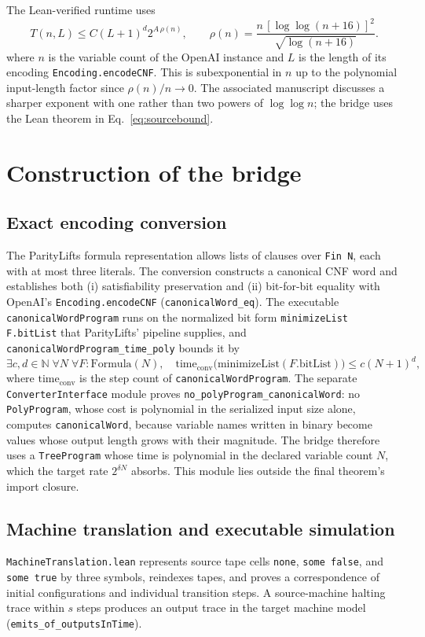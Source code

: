 \documentclass[11pt,letterpaper]{article}
\newcommand{\lean}[1]{\texttt{#1}}
\begin{document}
The Lean-verified runtime uses
\begin{equation}
T(n,L)\leq C(L+1)^d 2^{A\,\rho(n)},\qquad
\rho(n)=\frac{n\,[\log\log(n+16)]^2}{\sqrt{\log(n+16)}}.
\label{eq:sourcebound}
\end{equation}
where $n$ is the variable count of the OpenAI instance and $L$ is the length of its encoding \lean{Encoding.encodeCNF}.
This is subexponential in $n$ up to the polynomial input-length factor since $\rho(n)/n\to0$. The associated manuscript discusses a sharper exponent with one rather than two powers of $\log\log n$; the bridge uses the Lean theorem in Eq.~\eqref{eq:sourcebound}.

\section{Construction of the bridge}
\subsection{Exact encoding conversion}
The ParityLifts formula representation allows lists of clauses over \lean{Fin N}, each with at most three literals. The conversion constructs a canonical CNF word and establishes both (i) satisfiability preservation and (ii) bit-for-bit equality with OpenAI's \lean{Encoding.encodeCNF} (\lean{canonicalWord\_eq}). The executable \lean{canonicalWordProgram} runs on the normalized bit form \lean{minimizeList F.bitList} that ParityLifts' pipeline supplies, and \lean{canonicalWordProgram\_time\_poly} bounds it by
\begin{equation}
\exists c,d\in\mathbb N\;\forall N\;\forall F:\mathrm{Formula}(N),\quad
\mathrm{time}_{\mathrm{conv}}\bigl(\mathrm{minimizeList}(F.\mathrm{bitList})\bigr)\leq c(N+1)^d,
\end{equation}
where $\mathrm{time}_{\mathrm{conv}}$ is the step count of \lean{canonicalWordProgram}.
The separate \lean{ConverterInterface} module proves \lean{no\_polyProgram\_canonicalWord}: no \lean{PolyProgram}, whose cost is polynomial in the serialized input size alone, computes \lean{canonicalWord}, because variable names written in binary become values whose output length grows with their magnitude. The bridge therefore uses a \lean{TreeProgram} whose time is polynomial in the declared variable count $N$, which the target rate $2^{\delta N}$ absorbs. This module lies outside the final theorem's import closure.

\subsection{Machine translation and executable simulation}
\lean{MachineTranslation.lean} represents source tape cells \lean{none}, \lean{some false}, and \lean{some true} by three symbols, reindexes tapes, and proves a correspondence of initial configurations and individual transition steps. A source-machine halting trace within $s$ steps produces an output trace in the target machine model (\lean{emits\_of\_outputsInTime}).
\end{document}
